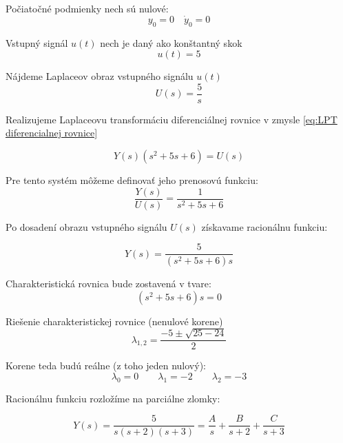 \documentclass[a4paper,10pt]{article}
\begin{document}
Počiatočné podmienky nech sú nulové:
\begin{equation*}
	y_0=0\quad \dot{y}_0=0
\end{equation*}

Vstupný signál $u(t)$ nech je daný ako konštantný skok
\begin{equation*}
	u(t)=5
\end{equation*}

Nájdeme Laplaceov obraz vstupného signálu $u(t)$
\begin{equation*}
	U(s)=\frac{5}{s}
\end{equation*}

Realizujeme Laplaceovu transformáciu diferenciálnej rovnice v zmysle \eqref{eq:LPT diferencialnej rovnice}

\begin{equation*}
	Y(s)\left(s^2+5s+6\right)=U(s)
\end{equation*}

Pre tento systém môžeme definovať jeho prenosovú funkciu:
\begin{equation*}
	\frac{Y(s)}{U(s)}=\frac{1}{s^2+5s+6}
\end{equation*}

Po dosadení obrazu vstupného signálu $U(s)$ získavame racionálnu funkciu:

\begin{equation*}
Y(s)=\frac{5}{\left(s^2+5s+6\right)s}
\end{equation*}

Charakteristická rovnica bude zostavená v tvare:
\begin{equation*}
	\left(s^2+5s+6\right)s=0
\end{equation*}

Riešenie charakteristickej rovnice (nenulové korene)
\begin{equation*}
	\lambda_{1,2}=\frac{-5\pm\sqrt{25-24}}{2}
\end{equation*}

Korene teda budú reálne (z toho jeden nulový):
\begin{equation*}
	 \lambda_0=0 \qquad \lambda_1=-2 \qquad \lambda_2=-3
\end{equation*}

Racionálnu funkciu rozložíme na parciálne zlomky:

\begin{equation*}
Y(s)=\frac{5}{s(s+2)(s+3)}=\frac{A}{s}+\frac{B}{s+2}+\frac{C}{s+3}
\end{equation*}
\end{document}
